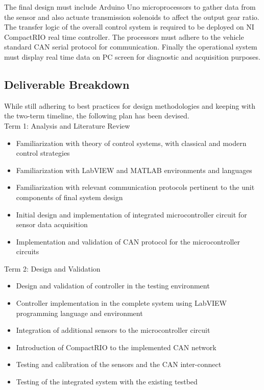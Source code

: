 \documentclass{article}
\begin{document}
\noindent The final design must include Arduino Uno microprocessors to gather data from the sensor and also actuate transmission solenoids to affect the output gear ratio. The transfer logic of the overall control system is required to be deployed on NI CompactRIO real time controller. The processors must adhere to the vehicle standard CAN serial protocol for communication. Finally the operational system must display real time data on PC screen for diagnostic and acquisition purposes.

\subsection{Deliverable Breakdown}
While still adhering to best practices for design methodologies and keeping with the two-term timeline, the following plan has been devised.\\

Term 1: Analysis and Literature Review
\begin{itemize}
\item Familiarization with theory of control systems, with classical and modern control strategies
\item Familiarization with LabVIEW and MATLAB environments and languages
\item Familiarization with relevant communication protocols pertinent to the unit components of final system design 
\item Initial design and implementation of integrated microcontroller circuit for sensor data acquisition
\item Implementation and validation of CAN protocol for the microcontroller circuits \\
\end{itemize}

Term 2: Design and Validation
\begin{itemize}
\item Design and validation of controller in the testing environment
\item Controller implementation in the complete system using LabVIEW programming language and environment
\item Integration of additional sensors to the microcontroller circuit
\item Introduction of CompactRIO to the implemented CAN network
\item Testing and calibration of the sensors and the CAN inter-connect
\item Testing of the integrated system with the existing testbed
\end{itemize}
\end{document}
